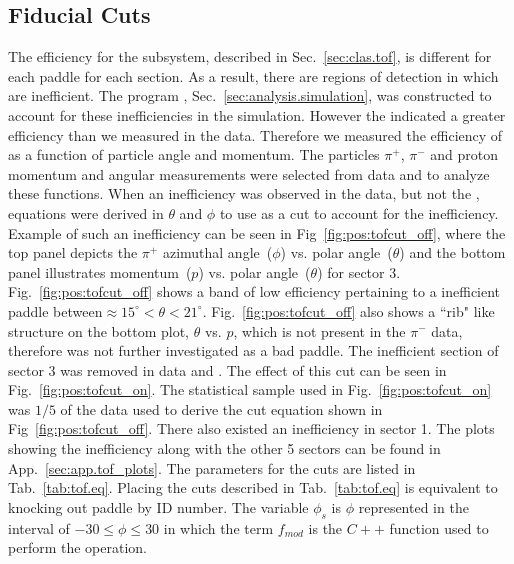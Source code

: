 \subsection{ Fiducial Cuts}\label{sec:analysis.tof_fid}

The efficiency for the  subsystem, described in Sec.~\ref{sec:clas.tof}, is different for each paddle for each section. As a result, there are regions of detection in which are inefficient. The program , Sec.~\ref{sec:analysis.simulation}, was constructed to account for these inefficiencies in the simulation. However the  indicated a greater efficiency than we measured in the data. Therefore we measured the efficiency of  as a function of particle angle and momentum. The particles $\pi^+$, $\pi^-$ and proton momentum and angular measurements were selected from data and  to analyze these functions. When an inefficiency was observed in the data, but not the , equations were derived in $\theta$ and $\phi$ to use as a cut to account for the inefficiency. Example of such an inefficiency can be seen in Fig~\ref{fig:pos:tofcut_off}, where the top panel depicts the $\pi^+$ azimuthal angle~($\phi$) vs. polar angle~($\theta$) and the bottom panel illustrates momentum~($p$) vs. polar angle~($\theta$) for sector 3.
%
Fig.~\ref{fig:pos:tofcut_off} shows a band of low efficiency pertaining to a inefficient  paddle between$\approx 15^\circ < \theta < 21^\circ$. Fig.~\ref{fig:pos:tofcut_off} also shows a ``rib" like structure on the bottom plot, $\theta$ vs. $p$, which is not present in the $\pi^-$ data, therefore was not further investigated as a bad paddle. The inefficient section of sector 3 was removed in data and . The effect of this cut can be seen in Fig.~\ref{fig:pos:tofcut_on}. The statistical sample used in Fig.~\ref{fig:pos:tofcut_on} was $1/5$ of the data used to derive the cut equation shown in Fig~\ref{fig:pos:tofcut_off}. There also existed an inefficiency in sector 1. The plots showing the inefficiency along with the other 5 sectors can be found in App.~\ref{sec:app.tof_plots}. The parameters for the  cuts are listed in Tab.~\ref{tab:tof.eq}. Placing the cuts described in Tab.~\ref{tab:tof.eq} is equivalent to knocking out  paddle by ID number. The variable $\phi_s$ is $\phi$ represented in the interval of $-30\le \phi \le30$ in which the term $f_{mod}$ is the $C++$ function used to perform the operation.
  


